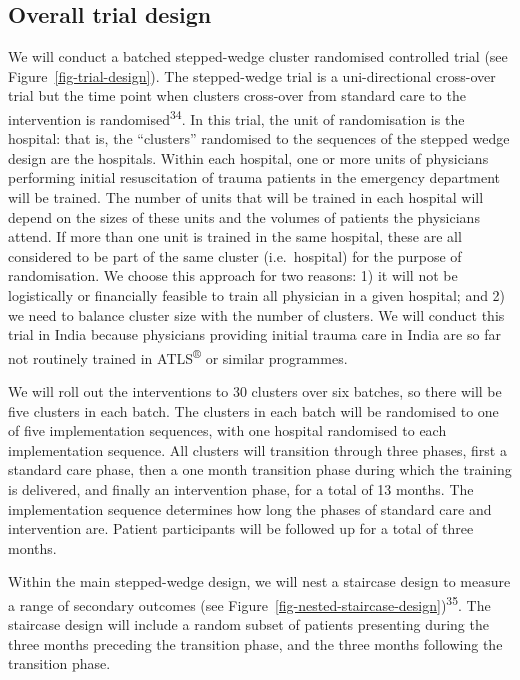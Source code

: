\documentclass[
]{scrartcl}
\begin{document}
\subsection{Overall trial design}\label{overall-trial-design}

We will conduct a batched stepped-wedge cluster randomised controlled
trial (see Figure~\ref{fig-trial-design}). The stepped-wedge trial is a
uni-directional cross-over trial but the time point when clusters
cross-over from standard care to the intervention is
randomised\textsuperscript{34}. In this trial, the unit of randomisation
is the hospital: that is, the ``clusters'' randomised to the sequences
of the stepped wedge design are the hospitals. Within each hospital, one
or more units of physicians performing initial resuscitation of trauma
patients in the emergency department will be trained. The number of
units that will be trained in each hospital will depend on the sizes of
these units and the volumes of patients the physicians attend. If more
than one unit is trained in the same hospital, these are all considered
to be part of the same cluster (i.e.~hospital) for the purpose of
randomisation. We choose this approach for two reasons: 1) it will not
be logistically or financially feasible to train all physician in a
given hospital; and 2) we need to balance cluster size with the number
of clusters. We will conduct this trial in India because physicians
providing initial trauma care in India are so far not routinely trained
in ATLS\textsuperscript{®} or similar programmes.

We will roll out the interventions to 30 clusters over six batches, so
there will be five clusters in each batch. The clusters in each batch
will be randomised to one of five implementation sequences, with one
hospital randomised to each implementation sequence. All clusters will
transition through three phases, first a standard care phase, then a one
month transition phase during which the training is delivered, and
finally an intervention phase, for a total of 13 months. The
implementation sequence determines how long the phases of standard care
and intervention are. Patient participants will be followed up for a
total of three months.

Within the main stepped-wedge design, we will nest a staircase design to
measure a range of secondary outcomes (see
Figure~\ref{fig-nested-staircase-design})\textsuperscript{35}. The
staircase design will include a random subset of patients presenting
during the three months preceding the transition phase, and the three
months following the transition phase.
\end{document}
